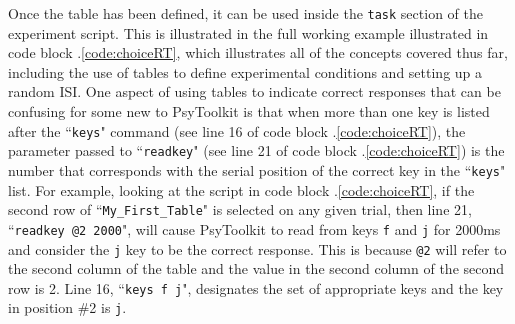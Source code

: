 Once the table has been defined, it can be used inside the \texttt{task} section of the experiment script.  This is illustrated in the full working example illustrated in code block \thechapter.\ref{code:choiceRT}, which illustrates all of the concepts covered thus far, including the use of tables to define experimental conditions and setting up a random ISI.  One aspect of using tables to indicate correct responses that can be confusing for some new to PsyToolkit is that when more than one key is listed after the ``\texttt{keys}" command (see line 16 of code block \thechapter.\ref{code:choiceRT}), the parameter passed to ``\texttt{readkey}" (see line 21 of code block \thechapter.\ref{code:choiceRT}) is the number that corresponds with the serial position of the correct key in the ``\texttt{keys}" list.  For example, looking at the script in code block \thechapter.\ref{code:choiceRT}, if the second row of ``\texttt{My\_First\_Table}" is selected on any given trial, then line 21, ``\texttt{readkey @2 2000}", will cause PsyToolkit to read from keys \texttt{f} and \texttt{j} for 2000ms and consider the \texttt{j} key to be the correct response. This is because \texttt{@2} will refer to the second column of the table and the value in the second column of the second row is 2.  Line 16, ``\texttt{keys f j}", designates the set of appropriate keys and the key in position \#2 is \texttt{j}.    

